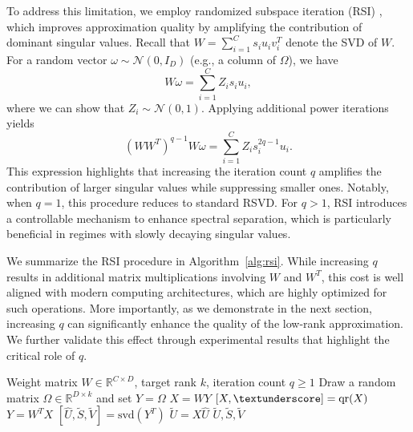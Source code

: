 \documentclass[twoside,leqno,onecolumn]{article}
\begin{document}
To address this limitation, we employ randomized subspace iteration (RSI) \cite{gu2015subspace,saibaba2019randomized,tropp2023randomized}, which improves approximation quality by amplifying the contribution of dominant singular values. Recall that 
$W = \sum_{i=1}^{C} s_i u_i v_i^T$ denote the SVD of \( W \). For a random vector \( \omega \sim \mathcal{N}(0, I_D) \) (e.g., a column of \( \Omega \)), we have
\begin{equation}
W \omega = \sum_{i=1}^{C} Z_i s_i u_i,
\end{equation}
where we can show that \( Z_i \sim \mathcal{N}(0,1) \). Applying additional power iterations yields
\begin{equation}
(WW^T)^{q-1} W \omega = \sum_{i=1}^{C} Z_i s_i^{2q-1} u_i.
\end{equation}
This expression highlights that increasing the iteration count \( q \) amplifies the contribution of larger singular values while suppressing smaller ones. 
Notably, when \( q = 1 \), this procedure reduces to standard RSVD. For \( q > 1 \), RSI introduces a controllable mechanism to enhance spectral separation, which is particularly beneficial in regimes with slowly decaying singular values. 

We summarize the RSI procedure in Algorithm~\ref{alg:rsi}. While increasing \( q \) results in additional matrix multiplications involving \( W \) and \( W^T \), this cost is well aligned with modern computing architectures, which are highly optimized for such operations. More importantly, as we demonstrate in the next section, increasing \( q \) can significantly enhance the quality of the low-rank approximation. We further validate this effect through experimental results that highlight the critical role of \( q \).
\begin{algorithm}[h]
\caption{Randomized Subspace Iteration (RSI)} \label{alg:rsi}
\begin{algorithmic}[1]
\REQUIRE Weight matrix $W \in \mathbb{R}^{C \times D}$, target rank $k$, iteration count $q\geq 1$
\STATE Draw a random matrix $\Omega \in \mathbb{R}^{D \times k}$ and set $Y=\Omega$
    \STATE $X = W Y$
    \STATE $[X, \textunderscore] = \mathrm{qr}(X)$
    \STATE $Y = W^T X$
\ENDFOR
\STATE $[\hat{U}, \widetilde{S}, \widetilde{V}] = \mathrm{svd}(Y^T)$
\STATE $\widetilde{U} = X \hat{U}$
\RETURN $\widetilde{U}, \widetilde{S}, \widetilde{V}$
\end{algorithmic}
\end{algorithm}
\end{document}
